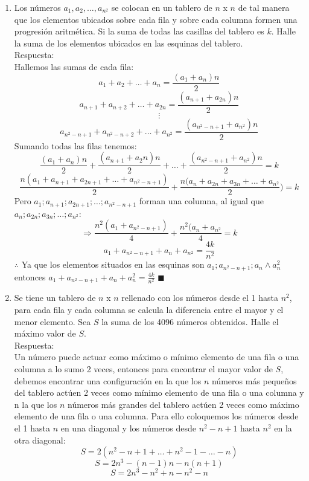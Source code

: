 \documentclass{book}
\begin{document}
\begin{enumerate}
    \item Los números $a_1,a_2,\ldots ,a_{n^2}$ se colocan en un tablero de $n$ x $n$ de tal manera que los elementos ubicados sobre cada fila y sobre cada columna formen una progresión aritmética. Si la suma de todas las casillas del tablero es $k$. Halle la suma de los elementos ubicados en las esquinas del tablero.\\
          Respuesta:\\
          Hallemos las sumas de cada fila:
          $$a_1+a_2+\ldots+a_n=\frac{(a_1+a_n)n}{2}$$
          $$a_{n+1}+a_{n+2}+\ldots+a_{2n}=\frac{(a_{n+1}+a_{2n})n}{2}$$
          $$\vdots$$
          $$a_{n^2-n+1}+a_{n^2-n+2}+\ldots+a_{n^2}=\frac{(a_{n^2-n+1}+a_{n^2})n}{2}$$
          Sumando todas las filas tenemos:
          $$\frac{(a_1+a_n)n}{2}+\frac{(a_{n+1}+a_2n)n}{2}+\ldots+\frac{(a_{n^2-n+1}+a_{n^2})n}{2}=k$$
          $$\frac{n(a_1+a_{n+1}+a_{2n+1}+\ldots+a_{n^2-n+1})}{2}+\frac{
              n(a_n+a_{2n}+a_{3n}+\ldots+a_{n^2}}{2})=k$$
          Pero $a_1;a_{n+1};a_{2n+1};\ldots;a_{n^2-n+1}$ forman una columna, al igual que $a_n;a_{2n};a_{3n};\ldots;a_{n^2}$:
          $$\Rightarrow\frac{n^2(a_1+a_{n^2-n+1})}{4}+\frac{
              n^2(a_n+a_{n^2}}{4}=k$$
          $$a_1+a_{n^2-n+1}+a_n+a_{n^2}=\frac{4k}{n^2}$$
          $\therefore$ Ya que los elementos situados en las esquinas son $a_1;a_{n^2-n+1};a_n\wedge a_n^2$ entonces $\displaystyle{a_1+a_{n^2-n+1}+a_n+a_n^2}=\frac{4k}{n^2}$ $\blacksquare$\\
    \item Se tiene un tablero de $n$ x $n$ rellenado con los números desde el 1 hasta $n^2$, para cada fila y cada columna se calcula la diferencia entre el mayor y el menor elemento. Sea $S$ la suma de los 4096 números obtenidos. Halle el máximo valor de $S$.\\
          Respuesta:\\
          Un número puede actuar como máximo o mínimo elemento de una fila o una columna a lo sumo 2 veces, entonces para encontrar el mayor valor de $S$, debemos encontrar una configuración en la que los $n$ números más pequeños del tablero actúen 2 veces como mínimo elemento de una fila o una columna y n la que los $n$ números más grandes del tablero actúen 2 veces como máximo elemento de una fila o una columna. Para ello coloquemos los números desde el 1 hasta $n$ en una diagonal y los números desde $n^2-n+1$ hasta $n^2$ en la otra diagonal:
          $$S=2(n^2-n+1+\ldots +n^2-1-\ldots-n)$$
          $$S=2n^3-(n-1)n-n(n+1)$$
          $$S=2n^3-n^2+n-n^2-n$$

\end{enumerate}
\end{document}
